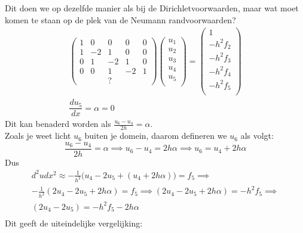 \documentclass[11pt]{article}
\begin{document}
Dit doen we op dezelfde manier als bij de Dirichletvoorwaarden, maar wat moet komen te staan op de plek van de Neumann randvoorwaarden?\\
\begin{gather*}
\begin{pmatrix}
1 & 0 & 0 & 0 & 0 \\
1 & -2& 1 & 0 & 0 \\
0 & 1 & -2& 1 & 0 \\
0 & 0 & 1 & -2& 1 \\
 &   & ? & &  
\end{pmatrix}
%
\begin{pmatrix}
u_{1}\\
u_{2}\\
u_{3}\\
u_{4}\\
u_{5}\\
\end{pmatrix}
=
\begin{pmatrix}
1\\
-h^2f_{2}\\
-h^2f_{3}\\
-h^2f_{4}\\
-h^2f_{5}\\
\end{pmatrix}\\
\dfrac{du_{5}}{dx} = \alpha = 0
\end{gather*}
Dit kan benaderd worden als
$\frac{u_{6}-u_{4}}{2h} = \alpha$.\\
Zoals je weet licht $u_{6}$ buiten je domein, daarom defineren we $u_{6}$ als volgt:\\
$$
\frac{u_{6}-u_{4}}{2h} = \alpha \implies u_{6}-u_{4} = 2h\alpha \implies u_{6} = u_{4} + 2h\alpha
$$
Dus\\
\begin{gather*}
{d^2u}{dx^2} \approx -\frac{1}{h^2}\big(u_{4}-2u_{5}+(u_{4} + 2h\alpha)\big) = f_{5} \implies\\
-\frac{1}{h^2}(2u_{4}-2u_{5}+ 2h\alpha) = f_{5}
\implies (2u_{4}-2u_{5}+ 2h\alpha) = -h^2f_{5} \implies\\
(2u_{4}-2u_{5}) = -h^2f_{5} - 2h\alpha\\
\end{gather*}
Dit geeft de uiteindelijke vergelijking:\\
\end{document}
